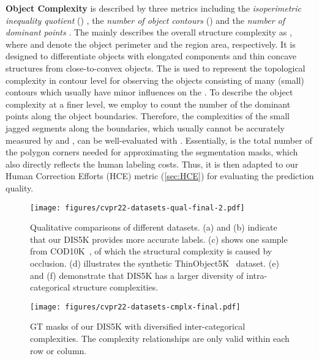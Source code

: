 \documentclass[10pt,twocolumn,letterpaper]{article}
\newcommand{\secref}[1]{\ref{#1}}
\begin{document}
\noindent\textbf{Object Complexity} is described by three metrics including the \textit{isoperimetric inequality quotient} () \cite{osserman1978isoperimetric,watson2012perimetric,yang2020meticulous}, the \textit{number of object contours} () and the \textit{number of dominant points} . The  mainly describes the overall structure complexity as , where  and  denote the object perimeter and the region area, respectively. It is designed to differentiate objects with elongated components and thin concave structures from close-to-convex objects. The  is used to represent the topological complexity in contour level for observing the objects consisting of many (small) contours which usually have minor influences on the . To describe the object complexity at a finer level, we employ  to count the number of the dominant points \cite{DBLP:journals/cvgip/Ramer72} along the object boundaries. 
Therefore, the complexities of the small jagged segments along the boundaries, which usually cannot be accurately measured by  and , can be well-evaluated with . Essentially,  is the total number of the polygon corners needed for approximating the segmentation masks, which also directly reflects the human labeling costs. Thus, it is then adapted to our Human Correction Efforts (HCE) metric (\secref{sec:HCE}) for evaluating the prediction quality.

\begin{figure*}[t!]
    \centering
    \texttt{[image: figures/cvpr22-datasets-qual-final-2.pdf]}
    \vspace{-20pt}
    \caption{\small Qualitative comparisons of different datasets. (a) and (b) indicate that our DIS5K provides more accurate labels. (c) shows one sample from COD10K~\cite{fan2020camouflaged}, of which the structural complexity is caused by occlusion. (d) illustrates the synthetic ThinObject5K~\cite{liew2021deep} dataset. (e) and (f) demonstrate that DIS5K has a larger diversity of intra-categorical structure complexities.}
    \label{fig:datasets-qual}
    \vspace{-10pt}
\end{figure*}

\begin{figure}[t!]
    \centering
    \texttt{[image: figures/cvpr22-datasets-cmplx-final.pdf]}
    \vspace{-10pt}
    \caption{\small GT masks of our DIS5K with diversified inter-categorical complexities. The complexity relationships are only valid within each row or column.}
    \label{fig:datasets-cmplx}
    \vspace{-10pt}
\end{figure}
\end{document}

